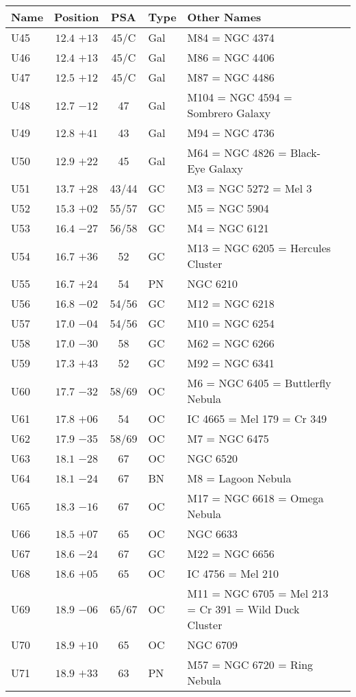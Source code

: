 \begin{table}[p]
\setlength{\tabcolsep}{3pt}
\small
\begin{tabular}{lcclll}
\hline
Name&Position&PSA&Type&Other Names\\
\hline
U45 &$12.4$ $+13$&45/C&Gal&M84 = NGC 4374\\
U46 &$12.4$ $+13$&45/C&Gal&M86 = NGC 4406\\
U47 &$12.5$ $+12$&45/C&Gal&M87 = NGC 4486\\
U48 &$12.7$ $-12$&47&Gal&M104 = NGC 4594 = Sombrero Galaxy\\
U49 &$12.8$ $+41$&43&Gal&M94 = NGC 4736\\
U50 &$12.9$ $+22$&45&Gal&M64 = NGC 4826 = Black-Eye Galaxy\\
U51 &$13.7$ $+28$&43/44&GC &M3 = NGC 5272 = Mel 3\\
U52 &$15.3$ $+02$&55/57&GC &M5 = NGC 5904\\
U53 &$16.4$ $-27$&56/58&GC &M4 = NGC 6121\\
U54 &$16.7$ $+36$&52&GC &M13 = NGC 6205 = Hercules Cluster\\
U55 &$16.7$ $+24$&54&PN &NGC 6210\\
U56 &$16.8$ $-02$&54/56&GC &M12 = NGC 6218\\
U57 &$17.0$ $-04$&54/56&GC &M10 = NGC 6254\\
U58 &$17.0$ $-30$&58&GC &M62 = NGC 6266\\
U59 &$17.3$ $+43$&52&GC &M92 = NGC 6341\\
U60 &$17.7$ $-32$&58/69&OC &M6 = NGC 6405 = Buttlerfly Nebula\\
U61 &$17.8$ $+06$&54&OC &IC 4665 = Mel 179 = Cr 349\\
U62 &$17.9$ $-35$&58/69&OC &M7 = NGC 6475\\
U63 &$18.1$ $-28$&67&OC &NGC 6520\\
U64 &$18.1$ $-24$&67&BN &M8 = Lagoon Nebula\\
U65 &$18.3$ $-16$&67&OC &M17 = NGC 6618 = Omega Nebula\\
U66 &$18.5$ $+07$&65&OC &NGC 6633\\
U67 &$18.6$ $-24$&67&GC &M22 = NGC 6656\\
U68 &$18.6$ $+05$&65&OC &IC 4756 = Mel 210\\
U69 &$18.9$ $-06$&65/67&OC &M11 = NGC 6705 = Mel 213 = Cr 391 = Wild Duck Cluster\\
U70 &$18.9$ $+10$&65&OC &NGC 6709\\
U71 &$18.9$ $+33$&63&PN &M57 = NGC 6720 = Ring Nebula\\

\end{tabular}
\end{table}
